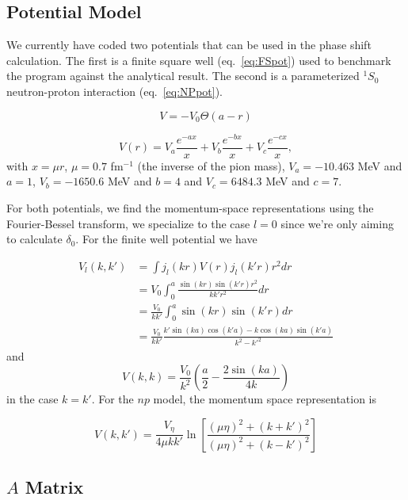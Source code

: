 \documentclass[10pt,showpacs,preprintnumbers,footinbib,amsmath,amssymb,aps,prl,twocolumn,groupedaddress,superscriptaddress,showkeys]{revtex4-1}
\begin{document}
\subsection{Potential Model}

We currently have coded two potentials that can be used in the phase shift
calculation. The first is a finite square well (eq.~\ref{eq:FSpot}) used to
benchmark the program against the analytical result. The second is a
parameterized $^1S_0$ neutron-proton interaction (eq.~\ref{eq:NPpot}).

\begin{equation}
	V = -V_0 \Theta(a - r)
	\label{eq:FSpot}
\end{equation}

\begin{equation}
	V(r)=V_a \frac{e^{-ax}}{x}+V_b \frac{e^{-bx}}{x}+V_c \frac{e^{-cx}}{x},
	\label{eq:NPpot}
\end{equation}
with $x=\mu r$, $\mu=0.7$ fm$^{-1}$ (the inverse of the pion mass),
$V_a=-10.463$ MeV and $a=1$, $V_b=-1650.6$ MeV and $b=4$ and
$V_c=6484.3$ MeV and $c=7$.

For both potentials, we find the momentum-space representations using
the Fourier-Bessel transform, we specialize to the case $l=0$ since we're
only aiming to calculate $\delta_0$. For the finite well potential we
have

\begin{align*}
	V_l(k,k')&= \int j_l(kr)V(r)j_l(k'r)r^2dr\\
	&= V_0 \int_0^a \frac{\sin(kr) \sin(k'r) r^2}{k k' r^2} dr\\
	&= \frac{V_0}{k k'} \int_0^a \sin(kr) \sin(k'r) dr\\
	&= \frac{V_0}{k k'} \frac{k' \sin(ka) \cos(k'a) - k \cos(ka) \sin(k'a)}{k^2 - k'^2}
\end{align*}
and
\begin{equation*}
	V(k,k) = \frac{V_0}{k^2} \left ( \frac{a}{2} - \frac{2 \sin (ka)}{4 k} \right )
\end{equation*}
in the case $k=k'$. For the $np$ model, the momentum space representation
is

\begin{equation*}
V (k,k') =\frac{V_{\eta}}{4\mu k k'}\ln\left[\frac{(\mu \eta)^{2}+(k+k')^{2}}
{(\mu\eta)^{2}+(k-k')^{2}}\right]
\end{equation*}


\subsection{$A$ Matrix}
\end{document}
